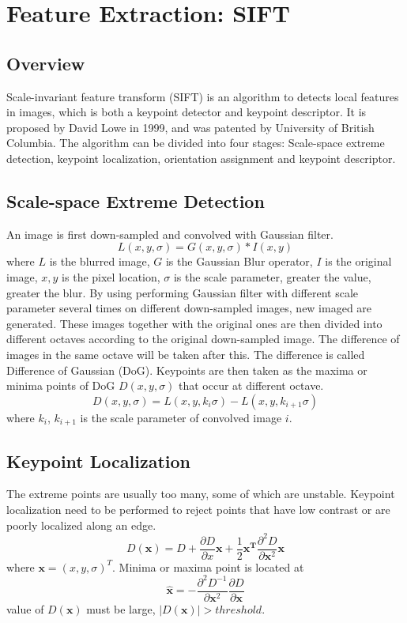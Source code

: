 \section{Feature Extraction: SIFT\cite{asgmt1}}
\subsection{Overview}
Scale-invariant feature transform (SIFT) is an algorithm to detects local features in images, 
which is both a keypoint detector and keypoint descriptor. 
It is proposed by David Lowe in 1999, and was patented by University of British Columbia.
The algorithm can be divided into four stages: 
Scale-space extreme detection, keypoint localization, orientation assignment and keypoint descriptor. 

\subsection{Scale-space Extreme Detection}
An image is first down-sampled and convolved with Gaussian filter.
$$
L(x, y, \sigma) = G(x, y, \sigma) * I(x, y)
$$
where 
$L$ is the blurred image, 
$G$ is the Gaussian Blur operator, 
$I$ is the original image, 
$x, y$ is the pixel location, 
$\sigma$ is the scale parameter, greater the value, greater the blur.
By using performing Gaussian filter with different scale parameter several times on different down-sampled images, new imaged are generated.
These images together with the original ones are then divided into different octaves according to the original down-sampled image.
The difference of images in the same octave will be taken after this. The difference is called Difference of Gaussian (DoG). 
Keypoints are then taken as the maxima or minima points of DoG $D(x, y, \sigma)$ that occur at different octave.
$$
D(x, y, \sigma) = L(x, y, k_i\sigma) - L(x, y, k_{i+1}\sigma)
$$
where $k_i$, $k_{i+1}$ is the scale parameter of convolved image $i$.

\subsection{Keypoint Localization}
The extreme points are usually too many, some of which are unstable.
Keypoint localization need to be performed to reject points that have low contrast or are poorly localized along an edge.
$$
D(\mathbf{x}) = D + \frac{\partial D }{\partial x}\mathbf{x} + \frac{1}{2}\mathbf{x^T}\frac{\partial ^ 2 D}{\partial \mathbf{x}^2}\mathbf{x}
$$
where $\mathbf{x} = (x, y, \sigma)^T$.
Minima or maxima point is located at 
$$
\hat{\mathbf{x}} = -\frac{\partial ^ 2 D^{-1}}{\partial \mathbf{x}^2}\frac{\partial D }{\partial \mathbf{x}}
$$
value of $D(\mathbf{x})$ must be large, $|D(\mathbf{x})| > threshold$.

